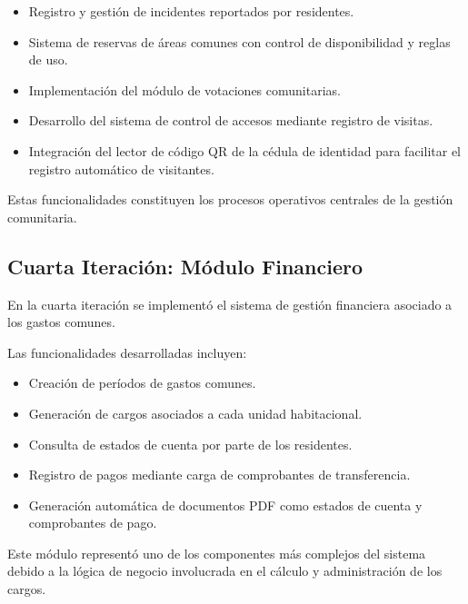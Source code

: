 \begin{itemize}

\item Registro y gestión de incidentes reportados por residentes.

\item Sistema de reservas de áreas comunes con control de disponibilidad y reglas de uso.

\item Implementación del módulo de votaciones comunitarias.

\item Desarrollo del sistema de control de accesos mediante registro de visitas.

\item Integración del lector de código QR de la cédula de identidad para facilitar el registro automático de visitantes.

\end{itemize}

Estas funcionalidades constituyen los procesos operativos centrales de la gestión comunitaria.

\subsection{Cuarta Iteración: Módulo Financiero}

En la cuarta iteración se implementó el sistema de gestión financiera asociado a los gastos comunes.

Las funcionalidades desarrolladas incluyen:

\begin{itemize}

\item Creación de períodos de gastos comunes.

\item Generación de cargos asociados a cada unidad habitacional.

\item Consulta de estados de cuenta por parte de los residentes.

\item Registro de pagos mediante carga de comprobantes de transferencia.

\item Generación automática de documentos PDF como estados de cuenta y comprobantes de pago.

\end{itemize}

Este módulo representó uno de los componentes más complejos del sistema debido a la lógica de negocio involucrada en el cálculo y administración de los cargos.

